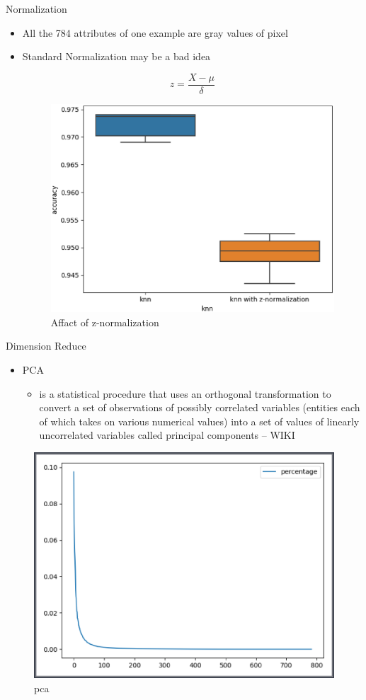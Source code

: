\documentclass[
 size=12pt,
 paper=smartboard, %
 mode=present, %
 display=slides, %
style=tuliplab,
pauseslide,
fleqn,leqno]{powerdot}
\begin{document}
\begin{slide}{Normalization}
  \begin{itemize}
  \item All the 784 attributes of one example are gray values of pixel \pause
  \item Standard Normalization may be a bad idea \pause

  $$
  z = \frac{X-\mu}{\delta}
  $$
  \pause
  \begin{figure}[h]
    \centering
    \includegraphics[width=0.5\linewidth]{figures/knn-z.eps}
    \caption{Affact of z-normalization }
    \label{fig:knnz}
  \end{figure}
  \end{itemize}
\end{slide}

\begin{slide}{Dimension Reduce}
  \begin{itemize}
    \item PCA
    \begin{itemize}
      \item is a statistical procedure that uses an orthogonal transformation to
      convert a set of observations of possibly correlated variables (entities 
      each of which takes on various numerical values) into a set of values of
      linearly uncorrelated variables called principal components -- WIKI \pause
    \end{itemize}
  \end{itemize}
  \begin{figure}[h]
    \centering
    \includegraphics[width=0.5\linewidth]{figures/pca.eps}
    \caption{pca}
    \label{fig:pca}
  \end{figure}
\end{slide}
\end{document}
